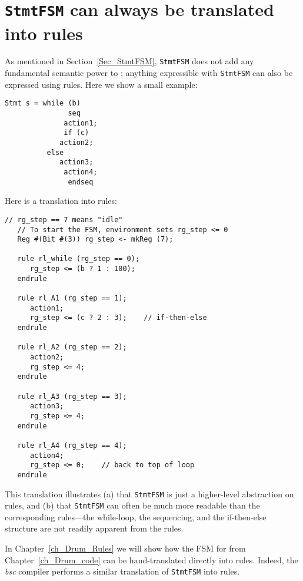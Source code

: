 
\section{{\tt StmtFSM} can always be translated into rules}

\label{Sec_StmtFSM_translation_into_rules}


As mentioned in Section~\ref{Sec_StmtFSM}, \verb|StmtFSM| does not add
any fundamental semantic power to {\BSV}; anything expressible with
\verb|StmtFSM| can also be expressed using rules.  
Here we show a small example:

{\footnotesize
\begin{Verbatim}[frame=single,label=BSV]
   Stmt s = while (b)
               seq
	          action1;
	          if (c)
		     action2;
		  else
		     action3;
	          action4;
               endseq
\end{Verbatim}
}

Here is a translation into rules:

{\footnotesize
\begin{Verbatim}[frame=single,label=BSV]
   // rg_step == 7 means "idle"
   // To start the FSM, environment sets rg_step <= 0
   Reg #(Bit #(3)) rg_step <- mkReg (7);

   rule rl_while (rg_step == 0);
      rg_step <= (b ? 1 : 100);
   endrule

   rule rl_A1 (rg_step == 1);
      action1;
      rg_step <= (c ? 2 : 3);    // if-then-else
   endrule

   rule rl_A2 (rg_step == 2);
      action2;
      rg_step <= 4;
   endrule

   rule rl_A3 (rg_step == 3);
      action3;
      rg_step <= 4;
   endrule

   rule rl_A4 (rg_step == 4);
      action4;
      rg_step <= 0;    // back to top of loop
   endrule
\end{Verbatim}
}

This translation illustrates (a) that \verb|StmtFSM| is just a
higher-level abstraction on rules, and (b) that \verb|StmtFSM| can
often be much more readable than the corresponding rules---the
while-loop, the sequencing, and the if-then-else structure are not
readily apparent from the rules.

In Chapter~\ref{ch_Drum_Rules} we will show how the FSM for {\DRUM} from
Chapter~\ref{ch_Drum_code} can be hand-translated directly into rules.
Indeed, the \emph{bsc} compiler performs a similar translation of
\verb|StmtFSM| into rules.

